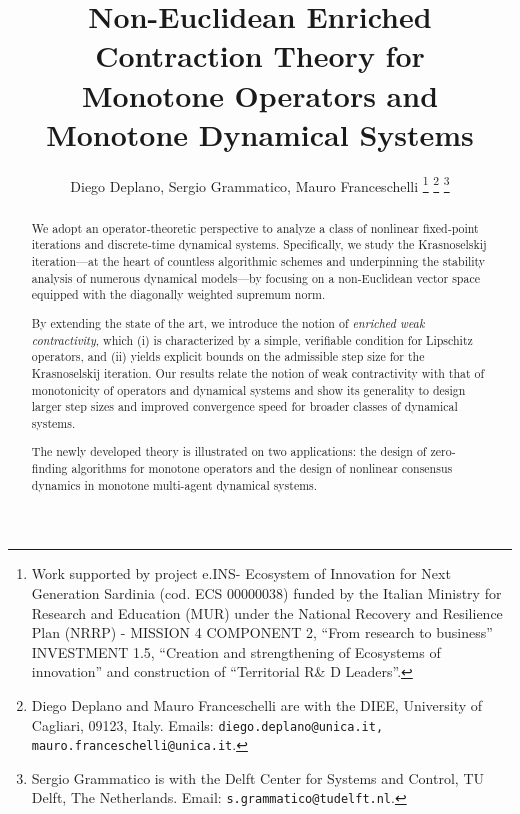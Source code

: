 \documentclass[journal,twoside,web]{ieeecolor}
\newcommand{\virg}[1]{``#1''}
\begin{document}

\title{\huge Non-Euclidean Enriched Contraction Theory for\\ Monotone Operators and Monotone Dynamical Systems}
%
\author{Diego Deplano, Sergio Grammatico, Mauro Franceschelli
%
\thanks{Work supported by project e.INS- Ecosystem of Innovation for Next Generation Sardinia (cod. ECS 00000038) funded by the Italian Ministry for Research and Education (MUR) under the National Recovery and Resilience Plan (NRRP) - MISSION 4 COMPONENT 2, \virg{From research to business} INVESTMENT 1.5, \virg{Creation and strengthening of Ecosystems of innovation} and construction of \virg{Territorial R\& D Leaders}.}
\thanks{Diego Deplano and Mauro Franceschelli are with the DIEE, University of Cagliari, 09123, Italy. Emails: {\tt\footnotesize diego.deplano@unica.it, mauro.franceschelli@unica.it}.}
\thanks{Sergio Grammatico is with the Delft Center for Systems and Control, TU Delft, The Netherlands. Email: {\tt\footnotesize s.grammatico@tudelft.nl}.}
}

\maketitle
\begin{abstract}
%
We adopt an operator‐theoretic perspective to analyze a class of nonlinear fixed‐point iterations and discrete‐time dynamical systems.
%
Specifically, we study the Krasnoselskij iteration---at the heart of countless algorithmic schemes and underpinning the stability analysis of numerous dynamical models---by focusing on a non‑Euclidean vector space equipped with the diagonally weighted supremum norm. 

By extending the state of the art, we introduce the notion of \emph{enriched weak contractivity}, which (i) is characterized by a simple, verifiable condition for Lipschitz operators, and (ii) yields explicit bounds on the admissible step size for the Krasnoselskij iteration.
%
Our results relate the notion of weak contractivity with that of monotonicity of operators and dynamical systems and show its generality to design larger step sizes and improved convergence speed for broader classes of dynamical systems.

The newly developed theory is illustrated on two applications: the design of zero-finding algorithms for monotone operators and the design of nonlinear consensus dynamics in monotone multi-agent dynamical systems.
\end{abstract}
\end{document}
